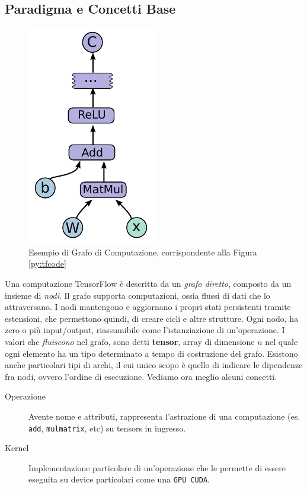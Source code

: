 \documentclass[DIV=calc, paper=a4, fontsize=11pt]{scrartcl}	 %
\begin{document}
\begin{multicols}{2}
		\section{Paradigma e Concetti Base}
			\begin{figure}[H]
				\centering
				\includegraphics[scale=.9]{img/computation.png}
				\caption{Esempio di Grafo di Computazione, corrispondente alla Figura \ref{py:tfcode}}
				\label{fig:computation}
			\end{figure}
			Una computazione TensorFlow è descritta da un \textit{grafo diretto}, composto da un insieme di \textit{nodi}. Il grafo supporta computazioni, ossia flussi di dati che lo attraversano. I nodi mantengono e aggiornano i propri stati persistenti tramite estensioni, che permettono quindi, di creare cicli e altre strutture. Ogni nodo, ha zero o più input/output, riassumibile come l'istanziazione di un'operazione. I valori che \textit{fluiscono} nel grafo, sono detti \textbf{tensor}, array di dimensione $n$ nel quale ogni elemento ha un tipo determinato a tempo di costruzione del grafo. Esistono anche particolari tipi di archi, il cui unico scopo è quello di indicare le dipendenze fra nodi, ovvero l'ordine di esecuzione. Vediamo ora meglio alcuni concetti.
			\begin{description}
				\item[Operazione] Avente nome e attributi, rappresenta l'astrazione di una computazione (es. \texttt{add}, \texttt{mulmatrix}, etc) su tensors in ingresso.
				\item[Kernel] Implementazione particolare di un'operazione che le permette di essere eseguita su device particolari come una \texttt{GPU CUDA}.

\end{description}
\end{multicols}
\end{document}
